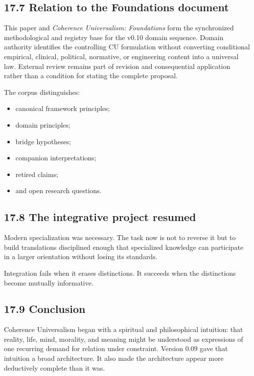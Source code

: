 \documentclass[
  11pt,
]{article}
\providecommand{\tightlist}{%
  \setlength{\itemsep}{0pt}\setlength{\parskip}{0pt}}
\begin{document}
\subsection{17.7 Relation to the Foundations
document}\label{relation-to-the-foundations-document}

This paper and \emph{Coherence Universalism: Foundations} form the
synchronized methodological and registry base for the v0.10 domain
sequence. Domain authority identifies the controlling CU formulation
without converting conditional empirical, clinical, political,
normative, or engineering content into a universal law. External review
remains part of revision and consequential application rather than a
condition for stating the complete proposal.

The corpus distinguishes:

\begin{itemize}
\tightlist
\item
  canonical framework principles;
\item
  domain principles;
\item
  bridge hypotheses;
\item
  companion interpretations;
\item
  retired claims;
\item
  and open research questions.
\end{itemize}

\subsection{17.8 The integrative project
resumed}\label{the-integrative-project-resumed}

Modern specialization was necessary. The task now is not to reverse it
but to build translations disciplined enough that specialized knowledge
can participate in a larger orientation without losing its standards.

Integration fails when it erases distinctions. It succeeds when the
distinctions become mutually informative.

\subsection{17.9 Conclusion}\label{conclusion}

Coherence Universalism began with a spiritual and philosophical
intuition: that reality, life, mind, morality, and meaning might be
understood as expressions of one recurring demand for relation under
constraint. Version 0.09 gave that intuition a broad architecture. It
also made the architecture appear more deductively complete than it was.
\end{document}
